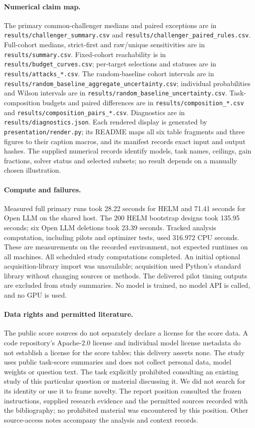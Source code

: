\paragraph{Numerical claim map.}
The primary common-challenger medians and paired exceptions are in \texttt{results/challenger\_summary.csv} and \texttt{results/challenger\_paired\_rules.csv}. Full-cohort medians, strict-first and raw/unique sensitivities are in \texttt{results/summary.csv}. Fixed-cohort reachability is in \texttt{results/budget\_curves.csv}; per-target selections and statuses are in \texttt{results/attacks\_*.csv}. The random-baseline cohort intervals are in \texttt{results/random\_baseline\_aggregate\_uncertainty.csv}; individual probabilities and Wilson intervals are in \texttt{results/random\_baseline\_uncertainty.csv}. Task-composition budgets and paired differences are in \texttt{results/composition\_*.csv} and \texttt{results/composition\_pairs\_*.csv}. Diagnostics are in \texttt{results/diagnostics.json}. Each rendered display is generated by \texttt{presentation/render.py}; its README maps all six table fragments and three figures to their caption macros, and its manifest records exact input and output hashes. The supplied numerical records identify models, task names, ceilings, gain fractions, solver status and selected subsets; no result depends on a manually chosen illustration.

\paragraph{Compute and failures.}
Measured full primary runs took 28.22 seconds for HELM and 71.41 seconds for Open LLM on the shared host. The 200 HELM bootstrap designs took 135.95 seconds; six Open LLM deletions took 23.39 seconds. Tracked analysis computation, including pilots and optimizer tests, used 316.972 CPU seconds. These are measurements on the recorded environment, not expected runtimes on all machines. All scheduled study computations completed. An initial optional acquisition-library import was unavailable; acquisition used Python's standard library without changing sources or methods. The delivered pilot timing outputs are excluded from study summaries. No model is trained, no model API is called, and no GPU is used.

\paragraph{Data rights and permitted literature.}
The public score sources do not separately declare a license for the score data. A code repository's Apache-2.0 license and individual model license metadata do not establish a license for the score tables; this delivery asserts none. The study uses public task-score summaries and does not collect personal data, model weights or question text. The task explicitly prohibited consulting an existing study of this particular question or material discussing it. We did not search for its identity or use it to frame novelty. The report position consulted the frozen instructions, supplied research evidence and the permitted sources recorded with the bibliography; no prohibited material was encountered by this position. Other source-access notes accompany the analysis and context records.
